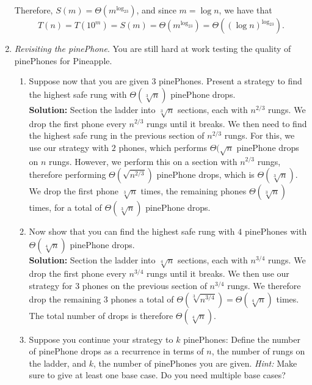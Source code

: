\documentclass[letterpaper,11pt]{article}
\begin{document}
\begin{enumerate}
Therefore, $S(m) = \Theta(m^{\log_23})$, and since $m = \log n$, we have that
\[T(n) = T(10^m) = S(m) = \Theta(m^{\log_23}) = \Theta((\log n)^{\log_23}).\]


\newpage
\item \emph{Revisiting the pinePhone}. You are still hard at work testing the quality of pinePhones for Pineapple.

\begin{enumerate}
\item Suppose now that you are given $3$ pinePhones. Present a strategy to find the highest safe rung with $\Theta(\sqrt[3]{n})$ pinePhone drops.\\[-8pt]

\textbf{Solution:} Section the ladder into $\sqrt[3]{n}$ sections, each with $n^{2/3}$ rungs. We drop the first phone every $n^{2/3}$ rungs until it breaks. We then need to find the highest safe rung in the previous section of $n^{2/3}$ rungs. For this, we use our strategy with $2$ phones, which performs $\Theta(\sqrt{n}$ pinePhone drops on $n$ rungs. However, we perform this on a section with $n^{2/3}$ rungs, therefore performing $\Theta(\sqrt{n^{2/3}})$ pinePhone drops, which is $\Theta(\sqrt[3]{n})$. We drop the first phone $\sqrt[3]{n}$ times, the remaining phones $\Theta(\sqrt[3]{n})$ times, for a total of $\Theta(\sqrt[3]{n})$ pinePhone drops.\\[-8pt]

\item Now show that you can find the highest safe rung with $4$ pinePhones with $\Theta(\sqrt[4]{n})$ pinePhone drops.\\[-8pt]

\textbf{Solution:} Section the ladder into $\sqrt[4]{n}$ sections, each with $n^{3/4}$ rungs. We drop the first phone every $n^{3/4}$ rungs until it breaks. We then use our strategy for $3$ phones on the previous section of $n^{3/4}$ rungs. We therefore drop the remaining $3$ phones a total of $\Theta(\sqrt[3]{n^{3/4}}) = \Theta(\sqrt[4]{n})$ times. The total number of drops is therefore $\Theta(\sqrt[4]{n})$.\\[-8pt]

\item Suppose you continue your strategy to $k$ pinePhones: Define the number of pinePhone drops as a recurrence in terms of $n$, the number of rungs on the ladder, and $k$, the number of pinePhones you are given. \emph{Hint:} Make sure to give at least one base case. Do you need multiple base cases?\\[-8pt]


\end{enumerate}
\end{enumerate}
\end{document}
